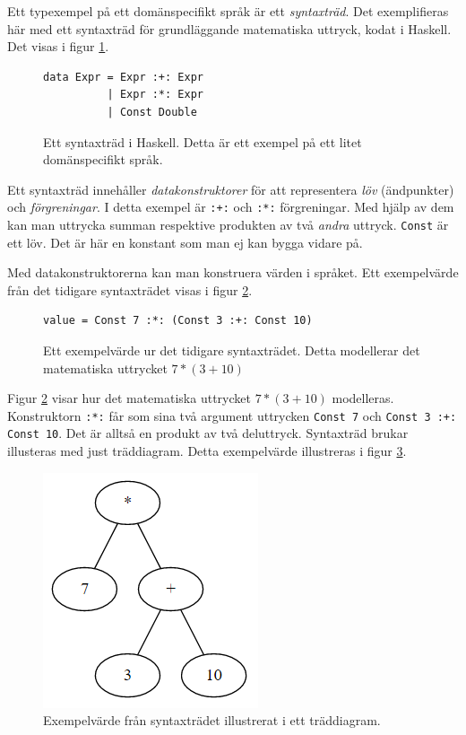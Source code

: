 \begin{draft}
Ett typexempel på ett domänspecifikt språk är ett \textit{syntaxträd}. Det exemplifieras här med ett syntaxträd för grundläggande matematiska uttryck, kodat i Haskell. Det visas i figur \ref{fig:syntax_exempel}.

\begin{figure}[tph]
  \begin{lstlisting}
data Expr = Expr :+: Expr
          | Expr :*: Expr
          | Const Double
  \end{lstlisting}
  \caption{Ett syntaxträd i Haskell. Detta är ett exempel på ett litet domänspecifikt språk.}
  \label{fig:syntax_exempel}
\end{figure}

Ett syntaxträd innehåller \textit{datakonstruktorer} för att representera \textit{löv} (ändpunkter) och \textit{förgreningar}. I detta exempel är \texttt{:+:} och \texttt{:*:} förgreningar. Med hjälp av dem kan man uttrycka summan respektive produkten av två \textit{andra} uttryck. \texttt{Const} är ett löv. Det är här en konstant som man ej kan bygga vidare på.

Med datakonstruktorerna kan man konstruera värden i språket. Ett exempelvärde från det tidigare syntaxträdet visas i figur \ref{fig:syntax_exempel_varde}.

\begin{figure}[tph]
  \begin{lstlisting}
value = Const 7 :*: (Const 3 :+: Const 10)
  \end{lstlisting}
  \caption{Ett exempelvärde ur det tidigare syntaxträdet. Detta modellerar det matematiska uttrycket $7 * (3 + 10)$}
  \label{fig:syntax_exempel_varde}
\end{figure}

Figur \ref{fig:syntax_exempel_varde} visar hur det matematiska uttrycket $7 * (3 + 10)$ modelleras. Konstruktorn \texttt{:*:} får som sina två argument uttrycken \texttt{Const 7} och \texttt{Const 3 :+: Const 10}. Det är alltså en produkt av två deluttryck. Syntaxträd brukar illusteras med just träddiagram. Detta exempelvärde illustreras i figur \ref{fig:syntax_exempel_bild}.

\begin{figure}[tph]
  \centering
  \includegraphics[width=0.4\linewidth]{figure/syntax_exempel_bild.png}
  \caption{Exempelvärde från syntaxträdet illustrerat i ett träddiagram.}
  \label{fig:syntax_exempel_bild}
\end{figure}


\end{draft}
